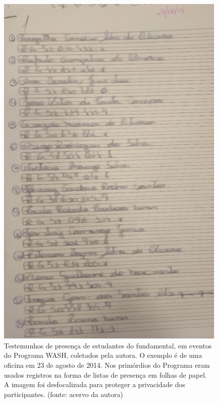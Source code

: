 \documentclass[
12pt,		%
openright,	%
twoside,  %
a4paper,			%
chapter=TITLE,		%
english,			%
french,				%
spanish,			%
brazil				%
]{USPSC-classe/USPSC}
\begin{document}
\captionsetup{format=plain}
\begin{figure}[max size={\textwidth}{\textheight}]

\centering


\begin{minipage}[b]{0.4\linewidth}
        \centering
                \includegraphics[width=1.0\linewidth]{../../imagens/blurred-Presenca-Oficina-2014-08-23.jpeg}
                \caption{Testemunhos de presen\c{c}a de estudantes do fundamental, em eventos do Programa WASH, coletados pela autora. O exemplo \'e de uma oficina em 23 de agosto de 2014. Nos prim\'ordios do Programa eram usados registros na forma de listas de presen\c{c}a em folhas de papel. A imagem foi desfocalizada para proteger a privacidade dos participantes. (fonte: acervo da autora)}

\end{minipage}
\end{figure}
\end{document}
